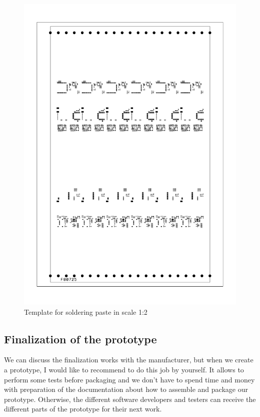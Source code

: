 \begin{figure}
    \centering
    \label{smtPasteTemplate}
    \caption{Template for soldering paste in scale 1:2}
    \includegraphics[angle=90, scale=0.5]{img/smtPasteTemplate.pdf}
\end{figure}

\subsection{Finalization of the prototype}
We can discuss the finalization works with the manufacturer, but when we create a prototype, I would like to recommend to do this job by yourself. It allows to perform some tests before packaging and we don't have to spend time and money with preparation of the documentation about how to assemble and package our prototype. Otherwise, the different software developers and testers can receive the different parts of the prototype for their next work.

